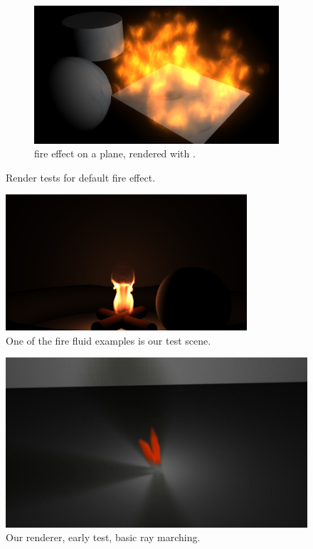 \begin{figure}[htpb!]
        \ContinuedFloat
 		\begin{subfigure}[t]{\textwidth}
                \includegraphics[width=\textwidth]{img/maya_fire_mental_ray}
                \caption{\Maya fire effect on a plane, rendered with \MentalRay.}
                \label{fig:maya_fire_mental_ray}
        \end{subfigure}%
        \caption{Render tests for \Maya default fire effect.}
        \label{fig:maya_fire_scenes}
\end{figure}

\begin{figure}[htbp!]
	\centering
	\includegraphics[width=0.8\textwidth, trim={8cm 0 8cm 10cm}, clip]{img/result_maya_fire_example}
	\caption{One of the \Maya fire fluid examples is our test scene.}
	\label{fig:result_maya_fire_example}
\end{figure}

\begin{figure}[htbp!]
	\centering
	\includegraphics[width=\textwidth]{img/result_early_stage}
	\caption{Our renderer, early test, basic ray marching.}
	\label{fig:result_early_stage}
\end{figure}

